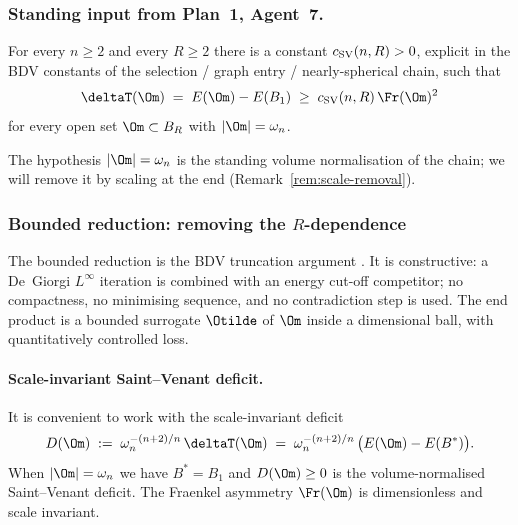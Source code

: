 \subsubsection*{Standing input from Plan~1, Agent~7.}

\begin{theorem}
\label{thm:SV-bounded}
For every $n\ge 2$ and every $R\ge 2$ there is a constant
$c_{\rm SV}(n,R)>0$, explicit in the BDV constants of the
selection / graph entry / nearly-spherical chain, such that
\begin{equation}\label{eq:SV-bounded}
\deltaT(\Om) \;=\; E(\Om)-E(B_1) \;\ge\; c_{\rm SV}(n,R)\,\Fr(\Om)^2
\end{equation}
for every open set $\Om\subset B_R$ with $|\Om|=\omega_n$.
\end{theorem}

The hypothesis $|\Om|=\omega_n$ is the standing volume normalisation
of the chain; we will remove it by scaling at the end
(Remark~\ref{rem:scale-removal}).

\subsubsection{Bounded reduction: removing the $R$-dependence}
\label{ssec:bounded-reduction}

The bounded reduction is the BDV truncation argument
\cite[Lemmas~5.1--5.3]{BDV}. It is constructive: a De~Giorgi
$L^\infty$ iteration is combined with an energy cut-off competitor;
no compactness, no minimising sequence, and no contradiction step is
used. The end product is a bounded surrogate $\Otilde$ of $\Om$ inside
a dimensional ball, with quantitatively controlled loss.

\paragraph{Scale-invariant Saint--Venant deficit.} It is convenient to
work with the scale-invariant deficit
\begin{equation}\label{eq:Dscaled}
D(\Om) \;:=\; \omega_n^{-(n+2)/n}\,\deltaT(\Om)
\;=\; \omega_n^{-(n+2)/n}\,\bigl(E(\Om)-E(B^*)\bigr).
\end{equation}
When $|\Om|=\omega_n$ we have $B^*=B_1$ and $D(\Om)\ge 0$ is the
volume-normalised Saint--Venant deficit. The Fraenkel asymmetry
$\Fr(\Om)$ is dimensionless and scale invariant.

